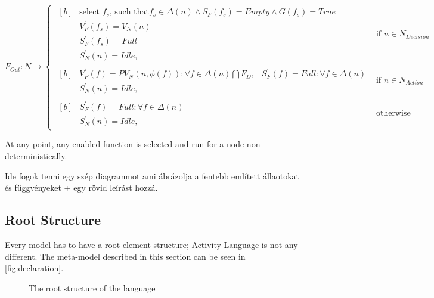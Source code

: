 \begin{definition}
\begin{equation}
	F_{Out} : N \rightarrow
	\begin{cases}
		\begin{aligned}[b]
			&\text{select } f_s \text{, such that} f_s \in \Delta(n) \wedge S_F(f_s) = \mathit{Empty} \wedge G(f_s) = \mathit{True} \\
			&V_F^\prime(f_s) = V_N(n) \\
			&S_F^\prime(f_s) = \mathit{Full} \\
			&S_N^\prime(n) = \mathit{Idle},
		\end{aligned} & \text{if } n \in N_\mathit{Decision} \\[8pt]
		\begin{aligned}[b]
			&V_F^\prime(f) = \mathit{PV}_N(n, \phi(f)) : \forall f \in \Delta(n) \bigcap F_D,
			&S_F^\prime(f) = \mathit{Full} : \forall f \in \Delta(n) \\
			&S_N^\prime(n) = \mathit{Idle},
		\end{aligned} & \text{if } n \in N_\mathit{Action} \\[8pt]
		\begin{aligned}[b]
			&S_F^\prime(f) = \mathit{Full} : \forall f \in \Delta(n) \\
			&S_N^\prime(n) = \mathit{Idle},
		\end{aligned} & \text{otherwise}
	\end{cases}
\end{equation}

At any point, any enabled function is selected and run for a node non-deterministically. 

\end{definition}

Ide fogok tenni egy szép diagrammot ami ábrázolja a fentebb említett állaotokat és függvényeket + egy rövid leírást hozzá.

\subsection{Root Structure}\label{ssec:root_structure}

Every model has to have a root element structure; Activity Language is not any different. The meta-model described in this section can be seen in \autoref{fig:declaration}.

\begin{figure}[!ht]
	\centering
	
	\caption{The root structure of the language}
	\label{fig:declaration}
\end{figure}

